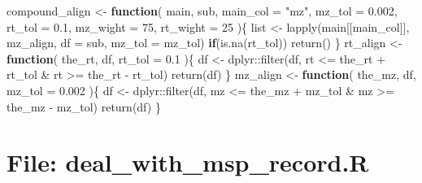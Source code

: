 \documentclass[
]{article}
\newenvironment{Shaded}{\begin{snugshade}}{\end{snugshade}}
\newcommand{\AttributeTok}[1]{\textcolor[rgb]{0.77,0.63,0.00}{#1}}
\newcommand{\ControlFlowTok}[1]{\textcolor[rgb]{0.13,0.29,0.53}{\textbf{#1}}}
\newcommand{\DecValTok}[1]{\textcolor[rgb]{0.00,0.00,0.81}{#1}}
\newcommand{\FloatTok}[1]{\textcolor[rgb]{0.00,0.00,0.81}{#1}}
\newcommand{\FunctionTok}[1]{\textcolor[rgb]{0.00,0.00,0.00}{#1}}
\newcommand{\NormalTok}[1]{#1}
\newcommand{\OtherTok}[1]{\textcolor[rgb]{0.56,0.35,0.01}{#1}}
\newcommand{\SpecialCharTok}[1]{\textcolor[rgb]{0.00,0.00,0.00}{#1}}
\newcommand{\StringTok}[1]{\textcolor[rgb]{0.31,0.60,0.02}{#1}}
\begin{document}
\begin{Shaded}
\begin{Highlighting}[]
\NormalTok{compound\_align }\OtherTok{\textless{}{-}} 
  \ControlFlowTok{function}\NormalTok{(}
\NormalTok{           main,}
\NormalTok{           sub,}
           \AttributeTok{main\_col =} \StringTok{"mz"}\NormalTok{,}
           \AttributeTok{mz\_tol =} \FloatTok{0.002}\NormalTok{,}
           \AttributeTok{rt\_tol =} \FloatTok{0.1}\NormalTok{,}
           \AttributeTok{mz\_wight =} \DecValTok{75}\NormalTok{,}
           \AttributeTok{rt\_wight =} \DecValTok{25}
\NormalTok{           )\{}
\NormalTok{    list }\OtherTok{\textless{}{-}} \FunctionTok{lapply}\NormalTok{(main[[main\_col]], mz\_align,}
                   \AttributeTok{df =}\NormalTok{ sub, }\AttributeTok{mz\_tol =}\NormalTok{ mz\_tol)}
    \ControlFlowTok{if}\NormalTok{(}\FunctionTok{is.na}\NormalTok{(rt\_tol))}
      \FunctionTok{return}\NormalTok{()}
\NormalTok{  \}}
\NormalTok{rt\_align }\OtherTok{\textless{}{-}} 
  \ControlFlowTok{function}\NormalTok{(}
\NormalTok{           the\_rt,}
\NormalTok{           df,}
           \AttributeTok{rt\_tol =} \FloatTok{0.1}
\NormalTok{           )\{}
\NormalTok{    df }\OtherTok{\textless{}{-}}\NormalTok{ dplyr}\SpecialCharTok{::}\FunctionTok{filter}\NormalTok{(df, rt }\SpecialCharTok{\textless{}=}\NormalTok{ the\_rt }\SpecialCharTok{+}\NormalTok{ rt\_tol }\SpecialCharTok{\&}
\NormalTok{                        rt }\SpecialCharTok{\textgreater{}=}\NormalTok{ the\_rt }\SpecialCharTok{{-}}\NormalTok{ rt\_tol)}
    \FunctionTok{return}\NormalTok{(df)}
\NormalTok{  \}}
\NormalTok{mz\_align }\OtherTok{\textless{}{-}} 
  \ControlFlowTok{function}\NormalTok{(}
\NormalTok{           the\_mz,}
\NormalTok{           df,}
           \AttributeTok{mz\_tol =} \FloatTok{0.002}
\NormalTok{           )\{}
\NormalTok{    df }\OtherTok{\textless{}{-}}\NormalTok{ dplyr}\SpecialCharTok{::}\FunctionTok{filter}\NormalTok{(df, mz }\SpecialCharTok{\textless{}=}\NormalTok{ the\_mz }\SpecialCharTok{+}\NormalTok{ mz\_tol }\SpecialCharTok{\&}
\NormalTok{                        mz }\SpecialCharTok{\textgreater{}=}\NormalTok{ the\_mz }\SpecialCharTok{{-}}\NormalTok{ mz\_tol)}
    \FunctionTok{return}\NormalTok{(df)}
\NormalTok{  \}}
\end{Highlighting}
\end{Shaded}

\hypertarget{file-deal_with_msp_record.r}{%
\section{File: deal\_with\_msp\_record.R}\label{file-deal_with_msp_record.r}}
\end{document}
